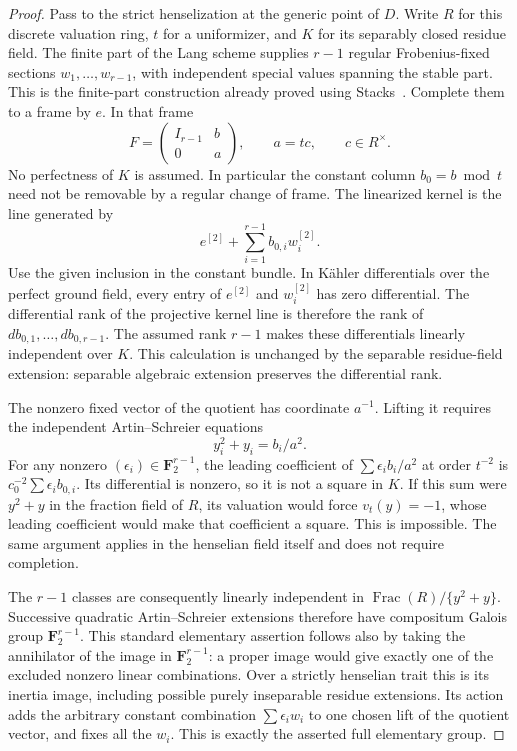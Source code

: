 \begin{proof}
Pass to the strict henselization at the generic point of $D$.
Write $R$ for this discrete valuation ring, $t$ for a uniformizer,
and $K$ for its separably closed residue field. The finite part of
the Lang scheme supplies $r-1$ regular Frobenius-fixed sections
$w_1,\ldots,w_{r-1}$, with independent special values spanning
the stable part. This is the finite-part construction already
proved using Stacks~\cite{Stacks0BTN,Stacks09ZS}. Complete them
to a frame by $e$. In that frame
\[
                   F=\begin{pmatrix}I_{r-1}&b\\0&a\end{pmatrix},
                  \qquad a=t c,\qquad c\in R^\times.
\]
No perfectness of $K$ is assumed. In particular the constant
column $b_0=b\bmod t$ need not be removable by a regular change
of frame. The linearized kernel is the line generated by
\[
             e^{[2]}+\sum_{i=1}^{r-1}b_{0,i}w_i^{[2]}.
\]
Use the given inclusion in the constant bundle. In Kähler
differentials over the perfect ground field, every entry of
$e^{[2]}$ and $w_i^{[2]}$ has zero differential. The differential
rank of the projective kernel line is therefore the rank of
$db_{0,1},\ldots,db_{0,r-1}$. The assumed rank $r-1$ makes
these differentials linearly independent over $K$. This calculation
is unchanged by the separable residue-field extension: separable
algebraic extension preserves the differential rank.

The nonzero fixed vector of the quotient has coordinate $a^{-1}$.
Lifting it requires the independent Artin--Schreier equations
\[
                      y_i^2+y_i=b_i/a^2.
\]
For any nonzero $(\epsilon_i)\in\mathbf F_2^{r-1}$, the leading
coefficient of $\sum\epsilon_i b_i/a^2$ at order $t^{-2}$ is
$c_0^{-2}\sum\epsilon_i b_{0,i}$. Its differential is nonzero,
so it is not a square in $K$. If this sum were $y^2+y$ in the
fraction field of $R$, its valuation would force $v_t(y)=-1$,
whose leading coefficient would make that coefficient a square.
This is impossible. The same argument applies in the henselian
field itself and does not require completion.

The $r-1$ classes are consequently linearly independent in
$\operatorname{Frac}(R)/\{y^2+y\}$. Successive quadratic
Artin--Schreier extensions therefore have compositum Galois group
$\mathbf F_2^{r-1}$. This standard elementary assertion follows
also by taking the annihilator of the image in
$\mathbf F_2^{r-1}$: a proper image would give exactly one of the
excluded nonzero linear combinations. Over a strictly henselian
trait this is its inertia image, including possible purely
inseparable residue extensions. Its action adds the arbitrary
constant combination $\sum\epsilon_iw_i$ to one chosen lift of
the quotient vector, and fixes all the $w_i$. This is exactly
the asserted full elementary group.
\end{proof}

